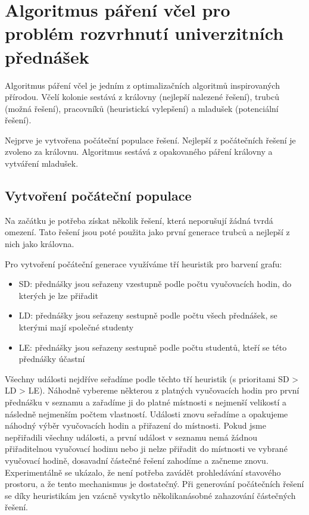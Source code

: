 \documentclass[12pt, a4paper]{article}
\begin{document}
\section{Algoritmus páření včel pro problém rozvrhnutí univerzitních přednášek}
Algoritmus páření včel je jedním z optimalizačních algoritmů inspirovaných přírodou.
Včelí kolonie sestává z královny (nejlepší nalezené řešení), trubců (možná řešení), pracovníků (heuristická vylepšení)
a mladušek (potenciální řešení).

Nejprve je vytvořena počáteční populace řešení. Nejlepší z počátečních řešení je zvoleno za královnu. Algoritmus sestává z opakovaného páření královny a vytváření mladušek.

\subsection{Vytvoření počáteční populace}
Na začátku je potřeba získat několik řešení, která neporušují žádná tvrdá omezení.
Tato řešení jsou poté použita jako první generace trubců a nejlepší z nich jako královna.

Pro vytvoření počáteční generace využíváme tří heuristik pro barvení grafu:
\begin{itemize}
  \item SD: přednášky jsou seřazeny vzestupně podle počtu vyučovacích hodin, do kterých je lze přiřadit
  \item LD: přednášky jsou seřazeny sestupně podle počtu všech přednášek, se kterými mají společné studenty
  \item LE: přednášky jsou seřazeny sestupně podle počtu studentů, kteří se této přednášky účastní
\end{itemize}
Všechny události nejdříve seřadíme podle těchto tří heuristik (s prioritami SD > LD > LE). Náhodně vybereme některou z platných vyučovacích hodin pro první přednášku v seznamu a zařadíme
ji do platné místnosti s nejmenší velikostí a následně nejmenším počtem vlastností.
Události znovu seřadíme a opakujeme náhodný výběr vyučovacích hodin a přiřazení do místnosti.
Pokud jsme nepřiřadili všechny události, a první událost v seznamu nemá žádnou přiřaditelnou vyučovací hodinu nebo ji nelze přiřadit do místnosti ve vybrané vyučovací hodině, dosavadní částečné řešení
zahodíme a začneme znovu. Experimentálně se ukázalo, že není potřeba zavádět prohledávání stavového prostoru, a že tento mechanismus je dostatečný. Při generování počátečních řešení se díky heuristikám jen vzácně vyskytlo několikanásobné zahazování částečných řešení.
\end{document}
